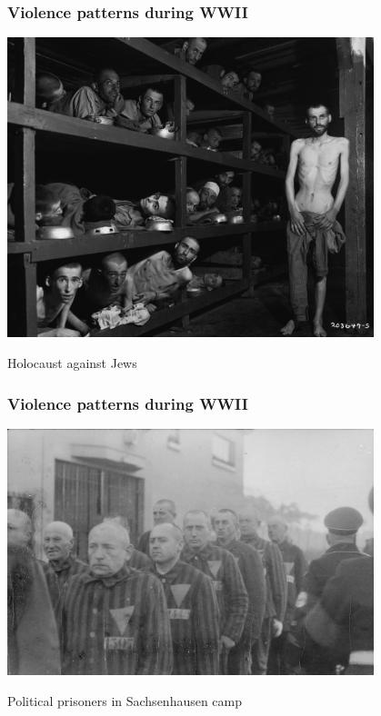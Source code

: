 \documentclass[aspectratio=43]{beamer}
\begin{document}
\begin{frame}
\frametitle{Violence patterns during WWII}
\centering

\includegraphics[width = 0.8\textwidth]{img/wwii-holocaust}

Holocaust against Jews

\end{frame}

\begin{frame}
\frametitle{Violence patterns during WWII}
\centering

\includegraphics[width = 0.8\textwidth]{img/wwii-Sachsenhausen}

Political prisoners in Sachsenhausen camp

\end{frame}

\end{document}
